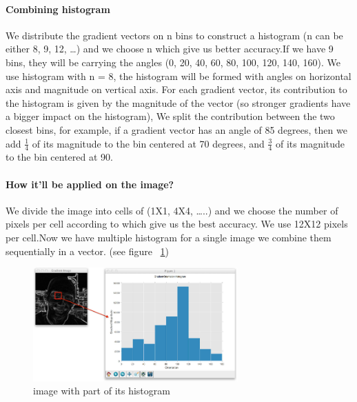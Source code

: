 \paragraph{Combining histogram}
We distribute the gradient vectors on n bins to construct a histogram (n can be either 8, 9, 12, …) and we choose n which give us better accuracy.\newline If we have 9 bins, they will be carrying the angles (0, 20, 40, 60, 80, 100, 120, 140, 160). \newline We use histogram with n = 8, the histogram will be formed with angles on horizontal axis and magnitude on vertical axis.
\newline For each gradient vector, its contribution to the histogram is given by the magnitude of the vector (so stronger gradients have a bigger impact on the histogram), We split the contribution between the two closest bins, for example, if a gradient vector has an angle of 85 degrees, then we add
\begin{math}
    \frac{1}{4}
\end{math} 
of its magnitude to the bin centered at 70 degrees, and 
\begin{math}
    \frac{3}{4} 
\end{math}
of its magnitude to the bin centered at 90.
\paragraph{How it’ll be applied on the image?}We divide the image into cells of (1X1, 4X4, …..) and we choose the number of pixels per cell according to which give us the best accuracy.\newline
We use 12X12 pixels per cell.\newline Now we have multiple histogram for a single image we combine them sequentially in a vector. (see figure ~\ref{fig:hist representation})
\begin{figure}
	\centering
	\includegraphics[width=0.7\textwidth]{images/histogram_ex.png}
	\caption{image with part of its histogram}
	\label{fig:hist representation}
\end{figure}
